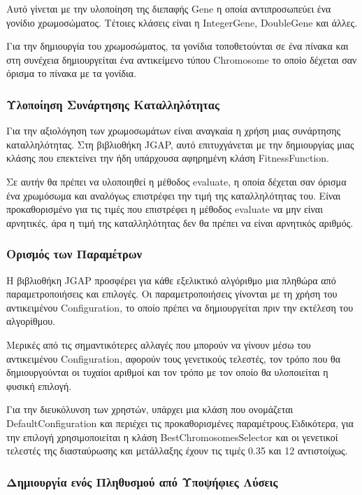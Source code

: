 Αυτό γίνεται με την υλοποίηση της διεπαφής Gene η οποία αντιπροσωπεύει ένα γονίδιο χρωμοσώματος. Τέτοιες κλάσεις είναι η IntegerGene, DoubleGene και άλλες.

Για την δημιουργία του χρωμοσώματος, τα γονίδια τοποθετούνται σε ένα πίνακα και στη συνέχεια δημιουργείται ένα αντικείμενο τύπου Chromosome το οποίο δέχεται σαν όρισμα το πίνακα με τα γονίδια.

\subsubsection{Υλοποίηση Συνάρτησης Καταλληλότητας}

Για την αξιολόγηση των χρωμοσωμάτων είναι αναγκαία η χρήση μιας συνάρτησης καταλληλότητας. Στη βιβλιοθήκη JGAP, αυτό επιτυχγάνεται με την δημιουργίας μιας κλάσης που επεκτείνει την ήδη υπάρχουσα αφηρημένη κλάση FitnessFunction.

Σε αυτήν θα πρέπει να υλοποιηθεί η μέθοδος evaluate, η οποία δέχεται σαν όρισμα ένα χρωμόσωμα και αναλόγως επιστρέφει την τιμή της καταλληλότητας του. Είναι προκαθορισμένο για τις τιμές που επιστρέφει η μέθοδος evaluate να μην είναι αρνητικές, άρα η τιμή της καταλληλότητας δεν θα πρέπει να είναι αρνητικός αριθμός.

\subsubsection{Ορισμός των Παραμέτρων}

Η βιβλιοθήκη JGAP προσφέρει για κάθε εξελικτικό αλγόριθμο μια πληθώρα από παραμετροποιήσεις και επιλογές. Οι παραμετροποιήσεις γίνονται με τη χρήση του αντικειμένου Configuration, το οποίο πρέπει να δημιουργείται πριν την εκτέλεση του αλγορίθμου.

Μερικές από τις σημαντικότερες αλλαγές που μπορούν να γίνουν μέσω του αντικειμένου Configuration, αφορούν τους γενετικούς τελεστές, τον τρόπο που θα δημιουργούνται οι τυχαίοι αριθμοί και τον τρόπο με τον οποίο θα υλοποιείται η φυσική επιλογή.

Για την διευκόλυνση των χρηστών, υπάρχει μια κλάση που ονομάζεται DefaultConfiguration και περιέχει τις προκαθορισμένες παραμέτρους.Ειδικότερα, για την επιλογή χρησιμοποιείται η κλάση BestChromosomesSelector και οι γενετικοί τελεστές της διασταύρωσης και μετάλλαξης έχουν τις τιμές 0.35 και 12 αντιστοίχως.

\subsubsection{Δημιουργία ενός Πληθυσμού από Υποψήφιες Λύσεις}

